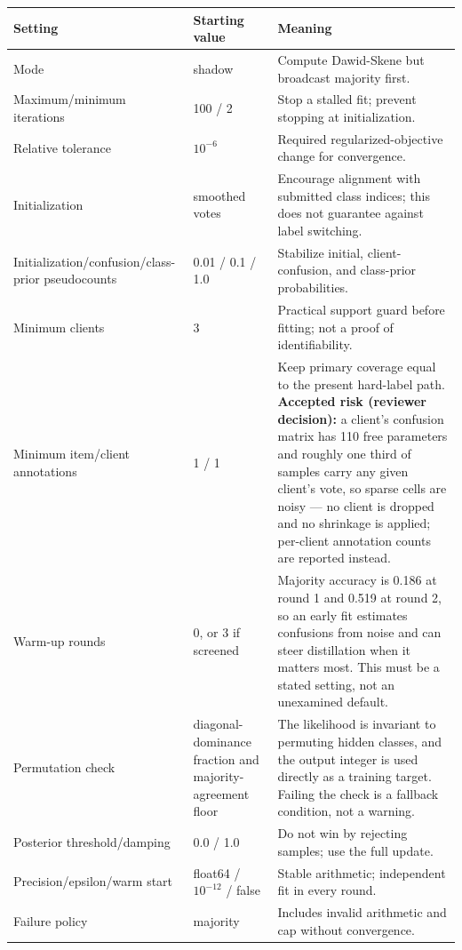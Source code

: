 \documentclass[10pt,a4paper]{article}
\begin{document}
\begin{table}[H]
\centering
\begin{tabularx}{\textwidth}{L{0.32\textwidth}L{0.18\textwidth}Y}
\toprule
\textbf{Setting} & \textbf{Starting value} & \textbf{Meaning} \\
\midrule
Mode & shadow & Compute Dawid-Skene but broadcast majority first. \\
Maximum/minimum iterations & 100 / 2 & Stop a stalled fit; prevent stopping at initialization. \\
Relative tolerance & $10^{-6}$ & Required regularized-objective change for convergence. \\
Initialization & smoothed votes & Encourage alignment with submitted class indices; this does not
guarantee against label switching. \\
Initialization/confusion/class-prior pseudocounts & 0.01 / 0.1 / 1.0 & Stabilize initial,
client-confusion, and class-prior probabilities. \\
Minimum clients & 3 & Practical support guard before fitting; not a proof of identifiability. \\
Minimum item/client annotations & 1 / 1 & Keep primary coverage equal to the present hard-label path.
\textbf{Accepted risk (reviewer decision):} a client's confusion matrix has 110 free parameters and
roughly one third of samples carry any given client's vote, so sparse cells are noisy --- no client is
dropped and no shrinkage is applied; per-client annotation counts are reported instead. \\
Warm-up rounds & 0, or 3 if screened & Majority accuracy is 0.186 at round 1 and 0.519 at round 2, so
an early fit estimates confusions from noise and can steer distillation when it matters most. This
must be a stated setting, not an unexamined default. \\
Permutation check & diagonal-dominance fraction and majority-agreement floor & The likelihood is
invariant to permuting hidden classes, and the output integer is used directly as a training target.
Failing the check is a fallback condition, not a warning. \\
Posterior threshold/damping & 0.0 / 1.0 & Do not win by rejecting samples; use the full update. \\
Precision/epsilon/warm start & float64 / $10^{-12}$ / false & Stable arithmetic; independent fit in
every round. \\
Failure policy & majority & Includes invalid arithmetic and cap without convergence. \\
\bottomrule
\end{tabularx}
\end{table}
\end{document}

